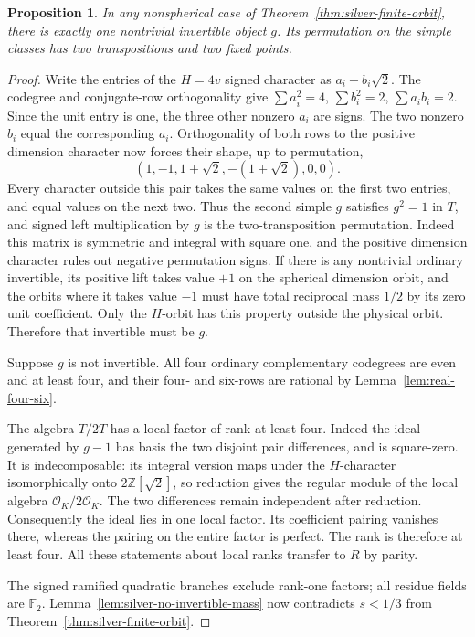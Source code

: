 \documentclass[11pt,reqno]{amsart}
\newtheorem{proposition}[theorem]{Proposition}
\theoremstyle{remark}\newtheorem{remark}[theorem]{Remark}
\numberwithin{equation}{section}
\begin{document}
\begin{proposition}\label{prop:silver-invertible}
In any nonspherical case of Theorem~\ref{thm:silver-finite-orbit},
there is exactly one nontrivial invertible object $g$. Its
permutation on the simple classes has two transpositions and two
fixed points.
\end{proposition}
\begin{proof}
Write the entries of the $H=4v$ signed character as $a_i+b_i\sqrt2$.
The codegree and conjugate-row orthogonality give
$\sum a_i^2=4$, $\sum b_i^2=2$, $\sum a_i b_i=2$. Since the unit
entry is one, the three other nonzero $a_i$ are signs. The two
nonzero $b_i$ equal the corresponding $a_i$. Orthogonality of
both rows to the positive dimension character now forces their
shape, up to permutation,
\[
 (1,-1,1+\sqrt2,-(1+\sqrt2),0,0).
\]
Every character outside this pair takes the same values on the
first two entries, and equal values on the next two. Thus the
second simple $g$ satisfies $g^2=1$ in $T$, and signed left
multiplication by $g$ is the two-transposition permutation. Indeed
this matrix is symmetric and integral with square one, and the
positive dimension character rules out negative permutation signs.
If there is any nontrivial ordinary invertible, its positive lift
takes value $+1$ on the spherical dimension orbit, and the orbits where it
takes value $-1$ must have total reciprocal mass $1/2$ by its zero
unit coefficient. Only the $H$-orbit has this property outside the
physical orbit. Therefore that invertible must be $g$.

Suppose $g$ is not invertible. All four ordinary complementary
codegrees are even and at least four, and their four- and six-rows
are rational by Lemma~\ref{lem:real-four-six}.

The algebra $T/2T$ has a local factor of rank at least four.
Indeed the ideal generated by $g-1$ has basis the two disjoint
pair differences, and is square-zero. It is indecomposable: its
integral version maps under the $H$-character isomorphically onto
$2\mathbb Z[\sqrt2]$, so reduction gives the regular module of
the local algebra $\mathcal O_K/2\mathcal O_K$. The two differences
remain independent after reduction. Consequently the ideal lies in
one local factor. Its coefficient pairing vanishes there, whereas
the pairing on the entire factor is perfect. The rank is therefore
at least four. All these statements about local ranks transfer
to $R$ by parity.

The signed ramified quadratic branches exclude rank-one factors;
all residue fields are $\mathbb F_2$. Lemma~\ref{lem:silver-no-invertible-mass}
now contradicts $s<1/3$ from Theorem~\ref{thm:silver-finite-orbit}.
\end{proof}
\end{document}
